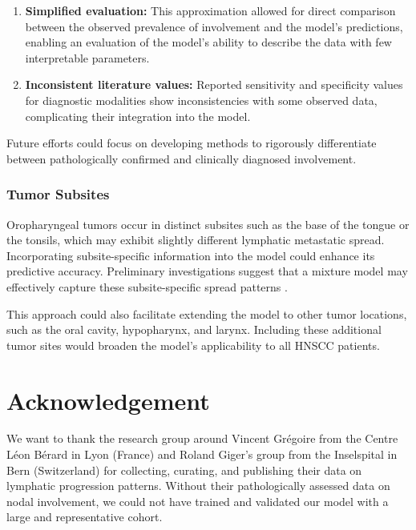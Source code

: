 \documentclass[
  sn-mathphys-num,
]{sn-jnl}
\providecommand{\tightlist}{%
  \setlength{\itemsep}{0pt}\setlength{\parskip}{0pt}}\usepackage{longtable,booktabs,array}
\begin{document}
\begin{enumerate}
\def\labelenumi{\arabic{enumi}.}
\tightlist
\item
  \textbf{Simplified evaluation:} This approximation allowed for direct
  comparison between the observed prevalence of involvement and the
  model's predictions, enabling an evaluation of the model's ability to
  describe the data with few interpretable parameters.
\item
  \textbf{Inconsistent literature values:} Reported sensitivity and
  specificity values for diagnostic modalities show inconsistencies with
  some observed data, complicating their integration into the model.
\end{enumerate}

Future efforts could focus on developing methods to rigorously
differentiate between pathologically confirmed and clinically diagnosed
involvement.

\subsubsection{Tumor Subsites}\label{tumor-subsites}

Oropharyngeal tumors occur in distinct subsites such as the base of the
tongue or the tonsils, which may exhibit slightly different lymphatic
metastatic spread. Incorporating subsite-specific information into the
model could enhance its predictive accuracy. Preliminary investigations
suggest that a mixture model may effectively capture these
subsite-specific spread patterns
\citep{sarrut_proceedings_2024, ludwig_modelling_2023a}.

This approach could also facilitate extending the model to other tumor
locations, such as the oral cavity, hypopharynx, and larynx. Including
these additional tumor sites would broaden the model's applicability to
all HNSCC patients.

\clearpage

\appendix

\section{Acknowledgement}\label{acknowledgement}

We want to thank the research group around Vincent Grégoire from the
Centre Léon Bérard in Lyon (France) and Roland Giger's group from the
Inselspital in Bern (Switzerland) for collecting, curating, and
publishing their data on lymphatic progression patterns. Without their
pathologically assessed data on nodal involvement, we could not have
trained and validated our model with a large and representative cohort.
\end{document}
